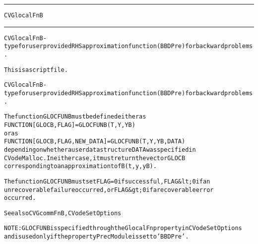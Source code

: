 \begin{samepage}
\hrule
\begin{center}
{\large \verb!CVGlocalFnB!}
\label{p:CVGlocalFnB}
\end{center}
\hrule\vspace{0.1in}



\begin{alltt}
CVGlocalFnB - type for user provided RHS approximation function (BBDPre) for backward problems.
\end{alltt}

\end{samepage}



\begin{samepage}


\begin{alltt}
This is a script file. 
\end{alltt}

\end{samepage}



\begin{alltt}
CVGlocalFnB - type for user provided RHS approximation function (BBDPre) for backward problems.

   The function GLOCFUNB must be defined either as
        FUNCTION [GLOCB, FLAG] = GLOCFUNB(T,Y,YB)
   or as
        FUNCTION [GLOCB, FLAG, NEW_DATA] = GLOCFUNB(T,Y,YB,DATA)
   depending on whether a user data structure DATA was specified in
   CVodeMalloc. In either case, it must return the vector GLOCB
   corresponding to an approximation to fB(t,y,yB).

   The function GLOCFUNB must set FLAG=0 if successful, FLAG&lt;0 if an
   unrecoverable failure occurred, or FLAG&gt;0 if a recoverable error
   occurred.

   See also CVGcommFnB, CVodeSetOptions

   NOTE: GLOCFUNB is specified through the GlocalFn property in CVodeSetOptions
   and is used only if the property PrecModule is set to 'BBDPre'.
\end{alltt}






\vspace{0.1in}